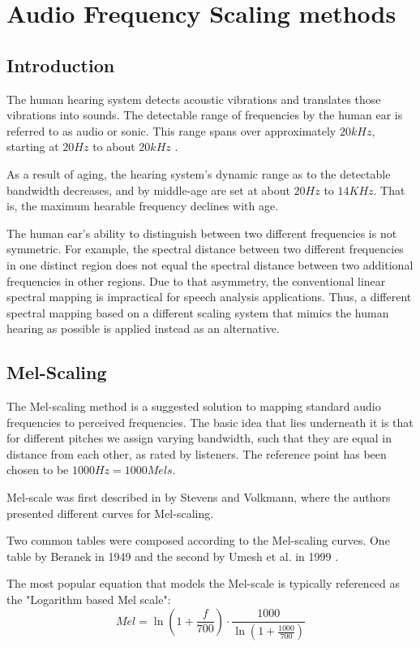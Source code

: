 \chapter{Audio Frequency Scaling methods}\label{ch:scaling_methods}
\section{Introduction}
The human hearing system detects
acoustic vibrations and translates 
those vibrations into sounds.
The detectable range of frequencies by the human ear
is referred to as audio or sonic. This range
spans over approximately \(20kHz\),
starting at \(20Hz\) to about \(20kHz\)
\cite{hearthres}.

As a result of aging, the hearing system's dynamic range 
as to the detectable bandwidth decreases,
and by middle-age are set at about
\(20Hz\) to  \(14KHz\)\cite{Wiley2008ChangesIH}.
That is, the maximum hearable frequency
declines with age.

The human ear's ability to distinguish 
between two different frequencies 
is not symmetric. 
For example, the spectral distance between two 
different frequencies in one distinct region does 
not equal the spectral distance 
between two additional frequencies in other regions.
Due to that asymmetry, the conventional linear 
spectral mapping is impractical for
speech analysis applications.
Thus, a different spectral mapping 
based on a different scaling system
that mimics the human hearing as possible
is applied instead as an alternative.

\section{Mel-Scaling}
The Mel-scaling method 
is a suggested solution to mapping 
standard audio frequencies to perceived frequencies.
The basic idea that lies underneath it is that for
different pitches we assign varying bandwidth,
such that they are equal in distance
from each other, as rated by listeners.
The reference point has been chosen to be 
\(1000 Hz = 1000 Mels\).

Mel-scale was first described in \cite{Volkmann} by Stevens and Volkmann,
where the authors presented different curves for Mel-scaling.

Two common tables were composed
according to the Mel-scaling curves. One table by 
Beranek in 1949 \cite{beranek1988acoustical} 
and the second by Umesh et al. in 1999 \cite{fitmelscale}.

The most popular equation that models the Mel-scale
is typically referenced as
the "Logarithm based Mel scale"\cite{o1987speech}:
\begin{equation}\label{eq:mel_1}
    Mel = \ln \left( 1 + \frac{f}{700} \right) \cdot \frac{1000}{\ln(1+\frac{1000}{700})} 
\end{equation}

